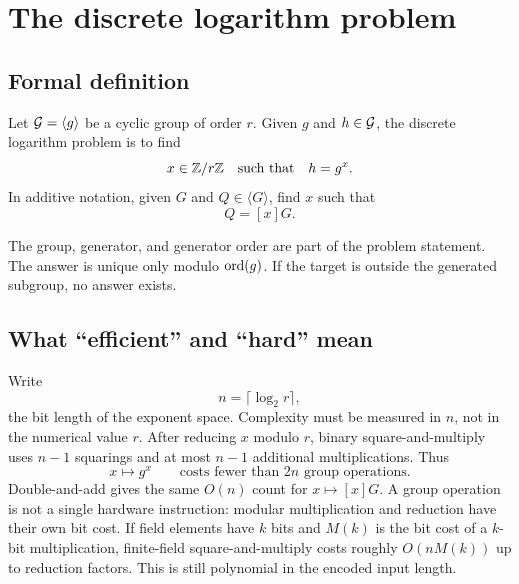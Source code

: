 \section{The discrete logarithm problem}

\subsection{Formal definition}

\begin{definition}
Let $\mathcal{G}=\langle g\rangle$ be a cyclic group of order $r$. Given $g$ and
$h\in\mathcal{G}$, the discrete logarithm problem is to find
\[
  x\in\mathbb{Z}/r\mathbb{Z}\quad\text{such that}\quad h=g^x.
\]
In additive notation, given $G$ and $Q\in\langle G\rangle$, find $x$ such that
\[
  Q=[x]G.
\]
\end{definition}

The group, generator, and generator order are part of the problem statement.
The answer is unique only modulo $\operatorname{ord}(g)$. If the target is outside the
generated subgroup, no answer exists.

\subsection{What ``efficient'' and ``hard'' mean}

Write
\[
  n=\lceil\log_2 r\rceil,
\]
the bit length of the exponent space. Complexity must be measured in $n$, not
in the numerical value $r$. After reducing $x$ modulo $r$, binary
square-and-multiply uses $n-1$ squarings and at most $n-1$ additional
multiplications. Thus
\[
  x\longmapsto g^x
  \qquad\text{costs fewer than $2n$ group operations.}
\]
Double-and-add gives the same $O(n)$ count for $x\mapsto[x]G$. A group
operation is not a single hardware instruction: modular multiplication and
reduction have their own bit cost. If field elements have $k$ bits and
$M(k)$ is the bit cost of a $k$-bit multiplication, finite-field
square-and-multiply costs roughly $O(nM(k))$ up to reduction factors. This is
still polynomial in the encoded input length.

\begin{center}
\end{center}

